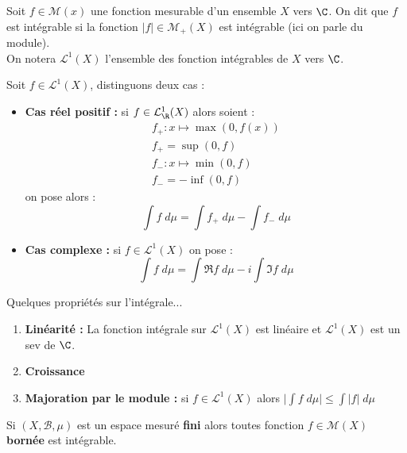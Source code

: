 \begin{definition}
    Soit $f \in \mathcal{M}(x)$ une fonction mesurable d'un ensemble $X$ vers $\C$. 
    On dit que $f$ est intégrable si la fonction $|f| \in \mathcal{M}_+(X)$ est intégrable (ici on parle du module). \\
    On notera $\mathcal{L}^1(X)$ l'ensemble des fonction intégrables de $X$ vers $\C$.
\end{definition}

\newpage
\begin{definition}
    Soit $f \in \mathcal{L}^1(X)$, distinguons deux cas :
    \begin{itemize}
        \item \textbf{Cas réel positif :} si $f \in \mathcal{L}^1_\R(X)$ alors soient :
            \begin{align*}
                f_+ : x \longmapsto \max (0, f(x)) \\ 
                f_+ = \sup (0, f) \\ 
                f_- : x \longmapsto \min (0, f) \\
                f_- = - \inf (0, f)
            \end{align*}
            on pose alors :
                \[ \int f \; d \mu = \int f_+ \; d \mu - \int f_- \; d \mu \] 
        \item \textbf{Cas complexe :} si $f \in \mathcal{L}^1(X)$ on pose :
            \[ \int f \; d \mu = \int \Re f \; d \mu - i \int \Im f \; d \mu \]
    \end{itemize}
\end{definition}

\begin{prop}
    Quelques propriétés sur l'intégrale...
    \begin{enumerate}
        \item \textbf{Linéarité :} La fonction intégrale sur $\mathcal{L}^1(X)$ est linéaire et $\mathcal{L}^1(X)$ est un sev de $\C$.
        \item \textbf{Croissance}
        \item \textbf{Majoration par le module :} si $f \in \mathcal{L}^1(X)$ alors $\Big| \int f \; d \mu \Big| \leq \int |f| \; d \mu$
    \end{enumerate}
\end{prop}

\begin{theorem}
    Si $(X,\mathcal{B},\mu)$ est un espace mesuré \textbf{fini} alors toutes fonction $ f \in \mathcal{M}(X)$ \textbf{bornée} est intégrable. 
\end{theorem}

